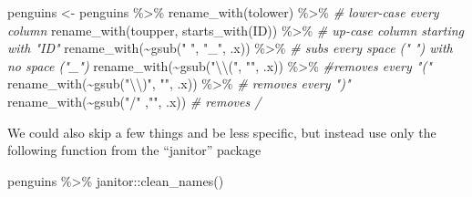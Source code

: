 \documentclass[
]{book}
\newenvironment{Shaded}{\begin{snugshade}}{\end{snugshade}}
\newcommand{\CommentTok}[1]{\textcolor[rgb]{0.56,0.35,0.01}{\textit{#1}}}
\newcommand{\FunctionTok}[1]{\textcolor[rgb]{0.00,0.00,0.00}{#1}}
\newcommand{\NormalTok}[1]{#1}
\newcommand{\OtherTok}[1]{\textcolor[rgb]{0.56,0.35,0.01}{#1}}
\newcommand{\SpecialCharTok}[1]{\textcolor[rgb]{0.00,0.00,0.00}{#1}}
\newcommand{\StringTok}[1]{\textcolor[rgb]{0.31,0.60,0.02}{#1}}
\begin{document}
\begin{Shaded}
\begin{Highlighting}[]
\NormalTok{penguins }\OtherTok{\textless{}{-}}\NormalTok{ penguins }\SpecialCharTok{\%\textgreater{}\%} 
  \FunctionTok{rename\_with}\NormalTok{(tolower) }\SpecialCharTok{\%\textgreater{}\%}  \CommentTok{\# lower{-}case every column}
  \FunctionTok{rename\_with}\NormalTok{(toupper, }\FunctionTok{starts\_with}\NormalTok{(}\StringTok{\textquotesingle{}ID\textquotesingle{}}\NormalTok{)) }\SpecialCharTok{\%\textgreater{}\%} \CommentTok{\# up{-}case column starting with "ID"}
  \FunctionTok{rename\_with}\NormalTok{(}\SpecialCharTok{\textasciitilde{}}\FunctionTok{gsub}\NormalTok{(}\StringTok{" "}\NormalTok{, }\StringTok{"\_"}\NormalTok{, .x))  }\SpecialCharTok{\%\textgreater{}\%} \CommentTok{\# subs every space (" ") with no space ("\_")}
  \FunctionTok{rename\_with}\NormalTok{(}\SpecialCharTok{\textasciitilde{}}\FunctionTok{gsub}\NormalTok{(}\StringTok{"}\SpecialCharTok{\textbackslash{}\textbackslash{}}\StringTok{("}\NormalTok{, }\StringTok{""}\NormalTok{, .x)) }\SpecialCharTok{\%\textgreater{}\%}  \CommentTok{\#removes every "("}
  \FunctionTok{rename\_with}\NormalTok{(}\SpecialCharTok{\textasciitilde{}}\FunctionTok{gsub}\NormalTok{(}\StringTok{"}\SpecialCharTok{\textbackslash{}\textbackslash{}}\StringTok{)"}\NormalTok{, }\StringTok{""}\NormalTok{, .x))  }\SpecialCharTok{\%\textgreater{}\%} \CommentTok{\# removes every ")"}
  \FunctionTok{rename\_with}\NormalTok{(}\SpecialCharTok{\textasciitilde{}}\FunctionTok{gsub}\NormalTok{(}\StringTok{"/"}\NormalTok{ ,}\StringTok{""}\NormalTok{, .x))  }\CommentTok{\# removes /}
\end{Highlighting}
\end{Shaded}

We could also skip a few things and be less specific, but instead use only the following function from the ``janitor'' package

\begin{Shaded}
\begin{Highlighting}[]
\NormalTok{penguins }\SpecialCharTok{\%\textgreater{}\%} 
\NormalTok{  janitor}\SpecialCharTok{::}\FunctionTok{clean\_names}\NormalTok{()}
\end{Highlighting}
\end{Shaded}
\end{document}
